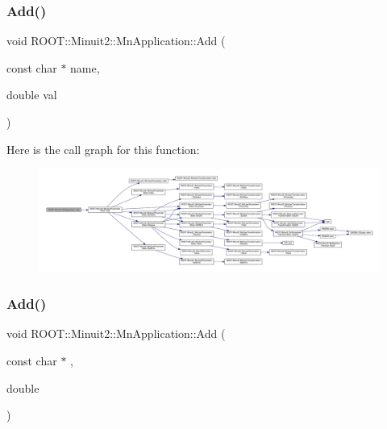 \mbox{\label{classROOT_1_1Minuit2_1_1MnApplication_a67220ef54f4862a27490162b2f7cf832}} 
\subsubsection{\texorpdfstring{Add()}{Add()}\hspace{0.1cm}{\footnotesize\ttfamily [5/6]}}
{\footnotesize\ttfamily void R\+O\+O\+T\+::\+Minuit2\+::\+Mn\+Application\+::\+Add (\begin{DoxyParamCaption}\item[{const char $\ast$}]{name,  }\item[{double}]{val }\end{DoxyParamCaption})}

Here is the call graph for this function\+:\nopagebreak
\begin{figure}[H]
\begin{center}
\leavevmode
\includegraphics[width=350pt]{df/dd5/classROOT_1_1Minuit2_1_1MnApplication_a67220ef54f4862a27490162b2f7cf832_cgraph}
\end{center}
\end{figure}
\mbox{\label{classROOT_1_1Minuit2_1_1MnApplication_a67220ef54f4862a27490162b2f7cf832}} 
\subsubsection{\texorpdfstring{Add()}{Add()}\hspace{0.1cm}{\footnotesize\ttfamily [6/6]}}
{\footnotesize\ttfamily void R\+O\+O\+T\+::\+Minuit2\+::\+Mn\+Application\+::\+Add (\begin{DoxyParamCaption}\item[{const char $\ast$}]{,  }\item[{double}]{ }\end{DoxyParamCaption})}

